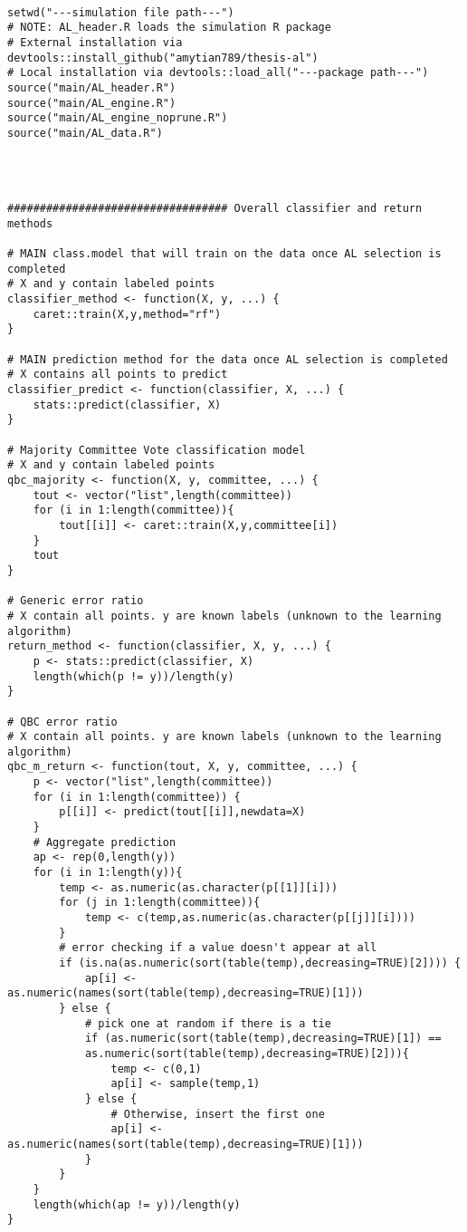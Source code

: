 {
\begin{lstlisting}

setwd("---simulation file path---")
# NOTE: AL_header.R loads the simulation R package
# External installation via devtools::install_github("amytian789/thesis-al")
# Local installation via devtools::load_all("---package path---")
source("main/AL_header.R")
source("main/AL_engine.R")
source("main/AL_engine_noprune.R")
source("main/AL_data.R")




################################## Overall classifier and return methods

# MAIN class.model that will train on the data once AL selection is completed
# X and y contain labeled points
classifier_method <- function(X, y, ...) {
	caret::train(X,y,method="rf")
}

# MAIN prediction method for the data once AL selection is completed
# X contains all points to predict
classifier_predict <- function(classifier, X, ...) {
	stats::predict(classifier, X)
}

# Majority Committee Vote classification model
# X and y contain labeled points
qbc_majority <- function(X, y, committee, ...) {
	tout <- vector("list",length(committee))
	for (i in 1:length(committee)){
		tout[[i]] <- caret::train(X,y,committee[i])
	}
	tout
}

# Generic error ratio
# X contain all points. y are known labels (unknown to the learning algorithm)
return_method <- function(classifier, X, y, ...) {
	p <- stats::predict(classifier, X)
	length(which(p != y))/length(y)
}

# QBC error ratio
# X contain all points. y are known labels (unknown to the learning algorithm)
qbc_m_return <- function(tout, X, y, committee, ...) {
	p <- vector("list",length(committee))
	for (i in 1:length(committee)) {
		p[[i]] <- predict(tout[[i]],newdata=X)
	}
	# Aggregate prediction
	ap <- rep(0,length(y))
	for (i in 1:length(y)){
		temp <- as.numeric(as.character(p[[1]][i]))
		for (j in 1:length(committee)){
			temp <- c(temp,as.numeric(as.character(p[[j]][i])))
		}
		# error checking if a value doesn't appear at all
		if (is.na(as.numeric(sort(table(temp),decreasing=TRUE)[2]))) {
			ap[i] <- as.numeric(names(sort(table(temp),decreasing=TRUE)[1]))
		} else {
			# pick one at random if there is a tie
			if (as.numeric(sort(table(temp),decreasing=TRUE)[1]) ==
			as.numeric(sort(table(temp),decreasing=TRUE)[2])){
				temp <- c(0,1)
				ap[i] <- sample(temp,1)
			} else {
				# Otherwise, insert the first one
				ap[i] <- as.numeric(names(sort(table(temp),decreasing=TRUE)[1]))
			}
		}
	}
	length(which(ap != y))/length(y)
}





\end{lstlisting}}
